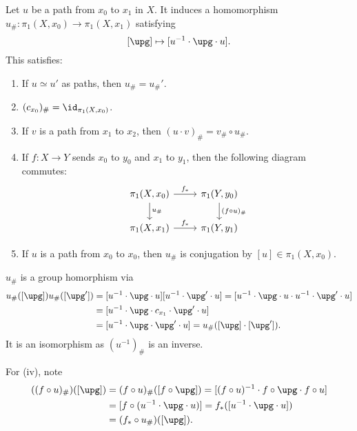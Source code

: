 \documentclass[12pt]{article}
\begin{document}
\begin{proposition}
	Let $u$ be a path from $x_0$ to $x_1$ in $X$. It induces a homomorphism $u_{\#} : \pi_1(X, x_0) \to \pi_1(X, x_1)$ satisfying
	\[
		[\upg] \mapsto [u^{-1} \cdot \upg \cdot u].
	\]
	This satisfies:
	\begin{enumerate}[\normalfont(i)]
		\item If $u \simeq u'$ as paths, then $u_{\#} = u_{\#}'$.
		\item $(c_{x_0})_{\#} = \id_{\pi_1(X, x_0)}$.
		\item If $v$ is a path from $x_1$ to $x_2$, then $(u \cdot v)_{\#} = v_{\#} \circ u_{\#}$.
		\item If $f : X \to Y$ sends $x_0$ to $y_0$ and $x_1$ to $y_1$, then the following diagram commutes:
			\[
			\begin{tikzcd}
				\pi_1(X, x_0) \arrow[r, "f_\ast"] \arrow[d, "u_{\#}"] & \pi_1(Y, y_0) \arrow[d, "(f \circ u)_{\#}"] \\
				\pi_1(X, x_1) \arrow[r, "f_\ast"] & \pi_1(Y, y_1)
			\end{tikzcd}
			\]
		\item If $u$ is a path from $x_0$ to $x_0$, then $u_{\#}$ is conjugation by $[u] \in \pi_1(X, x_0)$.
	\end{enumerate}
\end{proposition}

\begin{proofbox}
	$u_{\#}$ is a group homorphism via
	\begin{align*}
		u_{\#}([\upg]) u_{\#}([\upg']) &= [u^{-1} \cdot \upg \cdot u] [u^{-1} \cdot \upg' \cdot u] = [u^{-1} \cdot \upg \cdot u \cdot u^{-1} \cdot \upg' \cdot u] \\
					       &= [u^{-1} \cdot \upg \cdot c_{x_1} \cdot \upg' \cdot u] \\
					       &= [u^{-1} \cdot \upg \cdot \upg' \cdot u] = u_{\#}([\upg] \cdot [\upg']).
	\end{align*}
	It is an isomorphism as $(u^{-1})_{\#}$ is an inverse.

	For (iv), note
	\begin{align*}
		((f \circ u)_{\#})([\upg]) &= (f \circ u)_{\#}([f \circ \upg]) = [(f \circ u)^{-1} \cdot f \circ \upg \cdot f \circ u] \\
					   &= [f \circ (u^{-1} \cdot \upg \cdot u)] = f_\ast([u^{-1} \cdot \upg \cdot u]) \\
					   &= (f_\ast \circ u_{\#})([\upg]).
	\end{align*}
\end{proofbox}
\end{document}
